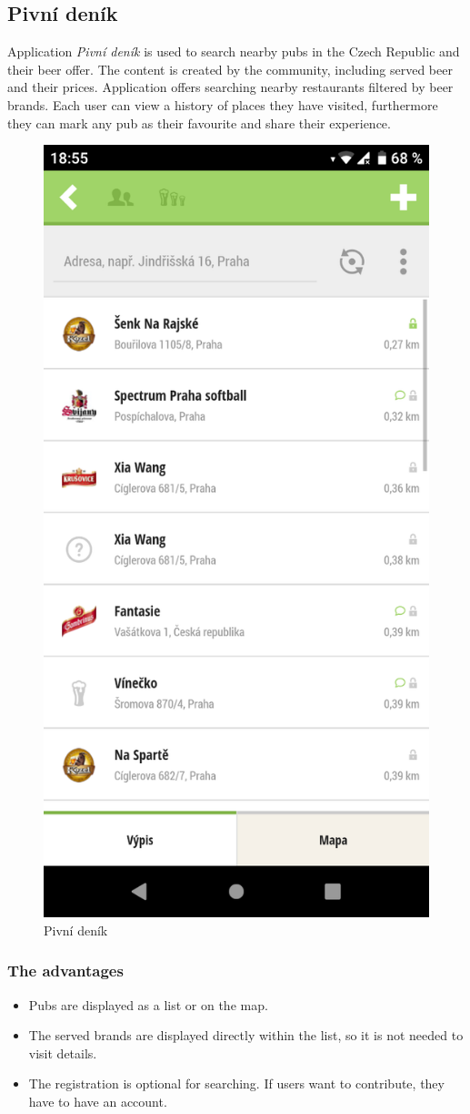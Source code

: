 \subsection{Pivní deník}
Application \textit{Pivní deník} is used to search nearby pubs in the Czech Republic and their beer offer. The content is created by the community, including served beer and their prices.  Application offers searching nearby restaurants filtered by beer brands. Each user can view a history of places they have visited, furthermore they can mark any pub as their favourite and share their experience.

\begin{figure}[ht]
    \centering
    \includegraphics[width=0.25\linewidth]{img/analysis/pivni_denik.png}
    \caption{Pivní deník \cite{app-pivni-denik}}
    \label{fig:pivni-denik}
\end{figure}

\subsubsection{The advantages}
\begin{itemize}
    \item Pubs are displayed as a list or on the map.
    \item The served brands are displayed directly within the list, so it is not needed to visit details.
    \item The registration is optional for searching. If users want to contribute, they have to have an account.
\end{itemize}


